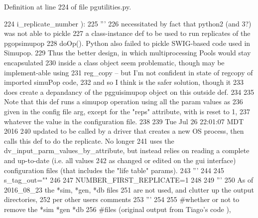 Definition at line 224 of file pgutilities.\+py.


\begin{DoxyCode}
224                                                 i\_replicate\_number ):
225     \textcolor{stringliteral}{'''}
226 \textcolor{stringliteral}{    necessitated by fact that python2 (and 3?) was not able to pickle }
227 \textcolor{stringliteral}{    a class-instance def to be used to run replicates of the pgopsimupop}
228 \textcolor{stringliteral}{    doOp().  Python also failed to pickle SWIG-based code used in Simupop.}
229 \textcolor{stringliteral}{    Thus the better design, in which  multiprocessing Pools would stay  encapsulated }
230 \textcolor{stringliteral}{    inside a class object seem problematic, though may be implement-able using }
231 \textcolor{stringliteral}{    reg\_copy -- but I'm not confident in state of regcopy of imported simuPop code,}
232 \textcolor{stringliteral}{    and so  I think is the safer solution, though it}
233 \textcolor{stringliteral}{    does create a depandancy of the pgguisimupop object on this outside def.  }
234 \textcolor{stringliteral}{}
235 \textcolor{stringliteral}{    Note that this def runs a simupop operation using all the param values as}
236 \textcolor{stringliteral}{    given in the config file arg, except for the "reps" attribute, with is reset to 1,}
237 \textcolor{stringliteral}{    whatever the value in the configuration file.}
238 \textcolor{stringliteral}{}
239 \textcolor{stringliteral}{    Tue Jul 26 22:01:07 MDT 2016}
240 \textcolor{stringliteral}{    updated to be called by a driver that creates a new OS process, then calls this def to do the
       replicate.  No longer}
241 \textcolor{stringliteral}{    uses the dv\_input\_parm\_values\_by\_attribute, but instead relies on reading a complete and up-to-date
       (i.e. all values}
242 \textcolor{stringliteral}{    as changed or edited on the gui interface) configuration files (that includes the "life table" params).}
243 \textcolor{stringliteral}{    '''}
244 
245     s\_tag\_out=\textcolor{stringliteral}{""}
246 
247     NUMBER\_FIRST\_REPLICATE=1
248 
249     \textcolor{stringliteral}{'''}
250 \textcolor{stringliteral}{    As of 2016\_08\_23 the *sim, *gen, *db files}
251 \textcolor{stringliteral}{    are not used, and clutter up the output directories,}
252 \textcolor{stringliteral}{    per other users comments}
253 \textcolor{stringliteral}{    '''}
254 
255     \textcolor{comment}{#whether or not to remove the *sim *gen *db}
256     \textcolor{comment}{#files (original output from Tiago's code ), }

\end{DoxyCode}
